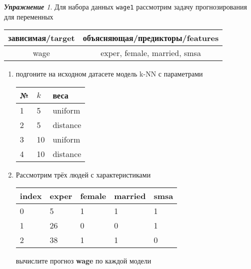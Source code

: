 \documentclass[a4,12pt]{article}
\theoremstyle{remark}
\newtheorem{exercise}{\textbf{Упражнение}}[section]
\begin{document}
\begin{exercise}
Для набора данных \texttt{wage1} рассмотрим задачу прогнозирования
для переменных
\begin{center}
	\begin{tabular}{|c|c|}\hline
		зависимая/target & объясняющая/предикторы/features \\ \hline
		wage & exper, female, married, smsa \\ \hline
	\end{tabular}
\end{center}
\begin{enumerate}
	\item подгоните на исходном датасете модель k-NN с параметрами
	\begin{center}
		\begin{tabular}{|l|l|l|}\hline
		№ & \(k\) & веса \\ \hline
		1 & 5 & uniform \\
		2 & 5 & distance \\
		3 & 10 & uniform \\
		4 & 10 & distance \\ \hline
		\end{tabular}
	\end{center}
	\item Рассмотрим трёх людей с характеристиками
	\begin{center}
		\begin{tabular}{|l||l|l|l|l|}\hline
			index & exper & female & married & smsa \\ \hline\hline
			0 & 5 & 1 & 1 & 1  \\
			1 & 26 & 0 & 0 & 1 \\
			2 & 38 & 1 & 1 & 0 \\ \hline
		\end{tabular}
	\end{center}
	вычислите прогноз \textbf{wage} по каждой модели
\end{enumerate}
\end{exercise}
\end{document}
